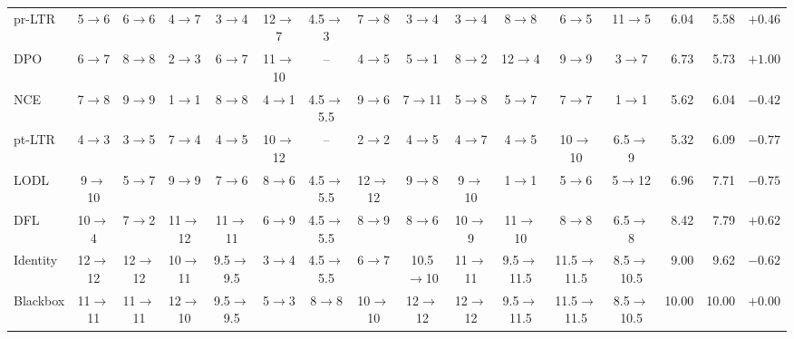 \begin{table}[t]
\begin{tabular}{@{}lccccccccccccrrr@{}}
pr-LTR & 5$\rightarrow$6 & 6$\rightarrow$6 & 4$\rightarrow$7 & 3$\rightarrow$4 & 12$\rightarrow$7 & 4.5$\rightarrow$3 & 7$\rightarrow$8 & 3$\rightarrow$4 & 3$\rightarrow$4 & 8$\rightarrow$8 & 6$\rightarrow$5 & 11$\rightarrow$5 & 6.04 & 5.58 & $+0.46$ \\
DPO & 6$\rightarrow$7 & 8$\rightarrow$8 & 2$\rightarrow$3 & 6$\rightarrow$7 & 11$\rightarrow$10 & -- & 4$\rightarrow$5 & 5$\rightarrow$1 & 8$\rightarrow$2 & 12$\rightarrow$4 & 9$\rightarrow$9 & 3$\rightarrow$7 & 6.73 & 5.73 & \cellcolor{green!18}$+1.00$ \\
NCE & 7$\rightarrow$8 & 9$\rightarrow$9 & 1$\rightarrow$1 & 8$\rightarrow$8 & 4$\rightarrow$1 & 4.5$\rightarrow$5.5 & 9$\rightarrow$6 & 7$\rightarrow$11 & 5$\rightarrow$8 & 5$\rightarrow$7 & 7$\rightarrow$7 & 1$\rightarrow$1 & 5.62 & 6.04 & $-0.42$ \\
pt-LTR & 4$\rightarrow$3 & 3$\rightarrow$5 & 7$\rightarrow$4 & 4$\rightarrow$5 & 10$\rightarrow$12 & -- & 2$\rightarrow$2 & 4$\rightarrow$5 & 4$\rightarrow$7 & 4$\rightarrow$5 & 10$\rightarrow$10 & 6.5$\rightarrow$9 & 5.32 & 6.09 & \cellcolor{red!18}$-0.77$ \\
LODL & 9$\rightarrow$10 & 5$\rightarrow$7 & 9$\rightarrow$9 & 7$\rightarrow$6 & 8$\rightarrow$6 & 4.5$\rightarrow$5.5 & 12$\rightarrow$12 & 9$\rightarrow$8 & 9$\rightarrow$10 & 1$\rightarrow$1 & 5$\rightarrow$6 & 5$\rightarrow$12 & 6.96 & 7.71 & \cellcolor{red!18}$-0.75$ \\
DFL & 10$\rightarrow$4 & 7$\rightarrow$2 & 11$\rightarrow$12 & 11$\rightarrow$11 & 6$\rightarrow$9 & 4.5$\rightarrow$5.5 & 8$\rightarrow$9 & 8$\rightarrow$6 & 10$\rightarrow$9 & 11$\rightarrow$10 & 8$\rightarrow$8 & 6.5$\rightarrow$8 & 8.42 & 7.79 & \cellcolor{green!18}$+0.62$ \\
Identity & 12$\rightarrow$12 & 12$\rightarrow$12 & 10$\rightarrow$11 & 9.5$\rightarrow$9.5 & 3$\rightarrow$4 & 4.5$\rightarrow$5.5 & 6$\rightarrow$7 & 10.5$\rightarrow$10 & 11$\rightarrow$11 & 9.5$\rightarrow$11.5 & 11.5$\rightarrow$11.5 & 8.5$\rightarrow$10.5 & 9.00 & 9.62 & \cellcolor{red!18}$-0.62$ \\
Blackbox & 11$\rightarrow$11 & 11$\rightarrow$11 & 12$\rightarrow$10 & 9.5$\rightarrow$9.5 & 5$\rightarrow$3 & 8$\rightarrow$8 & 10$\rightarrow$10 & 12$\rightarrow$12 & 12$\rightarrow$12 & 9.5$\rightarrow$11.5 & 11.5$\rightarrow$11.5 & 8.5$\rightarrow$10.5 & 10.00 & 10.00 & $+0.00$ \\
\bottomrule
\end{tabular}
\end{table}

